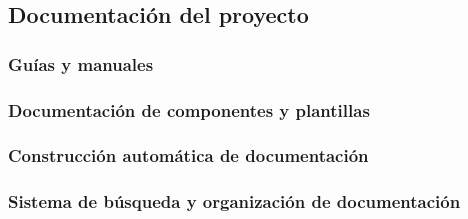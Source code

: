 \subsection{Documentación del proyecto}
\subsubsection{Guías y manuales}
\subsubsection{Documentación de componentes y plantillas}
\subsubsection{Construcción automática de documentación}
\subsubsection{Sistema de búsqueda y organización de documentación}

